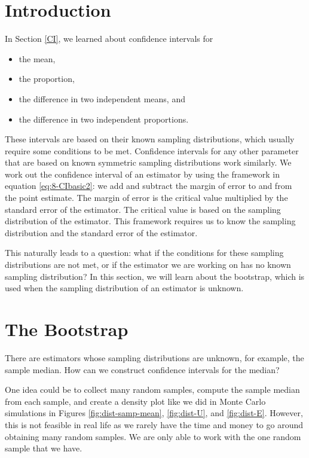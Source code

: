 \documentclass[
]{book}
\providecommand{\tightlist}{%
  \setlength{\itemsep}{0pt}\setlength{\parskip}{0pt}}
\theoremstyle{definition}
\theoremstyle{definition}
\theoremstyle{definition}
\theoremstyle{definition}
\theoremstyle{remark}
\begin{document}
\hypertarget{introduction-3}{%
\section{Introduction}\label{introduction-3}}

In Section \ref{CI}, we learned about confidence intervals for

\begin{itemize}
\tightlist
\item
  the mean,
\item
  the proportion,
\item
  the difference in two independent means, and
\item
  the difference in two independent proportions.
\end{itemize}

These intervals are based on their known sampling distributions, which usually require some conditions to be met. Confidence intervals for any other parameter that are based on known symmetric sampling distributions work similarly. We work out the confidence interval of an estimator by using the framework in equation \eqref{eq:8-CIbasic2}: we add and subtract the margin of error to and from the point estimate. The margin of error is the critical value multiplied by the standard error of the estimator. The critical value is based on the sampling distribution of the estimator. This framework requires us to know the sampling distribution and the standard error of the estimator.

This naturally leads to a question: what if the conditions for these sampling distributions are not met, or if the estimator we are working on has no known sampling distribution? In this section, we will learn about the bootstrap, which is used when the sampling distribution of an estimator is unknown.

\hypertarget{bootstrap}{%
\section{The Bootstrap}\label{bootstrap}}

There are estimators whose sampling distributions are unknown, for example, the sample median. How can we construct confidence intervals for the median?

One idea could be to collect many random samples, compute the sample median from each sample, and create a density plot like we did in Monte Carlo simulations in Figures \ref{fig:dist-samp-mean}, \ref{fig:dist-U}, and \ref{fig:dist-E}. However, this is not feasible in real life as we rarely have the time and money to go around obtaining many random samples. We are only able to work with the one random sample that we have.
\end{document}
